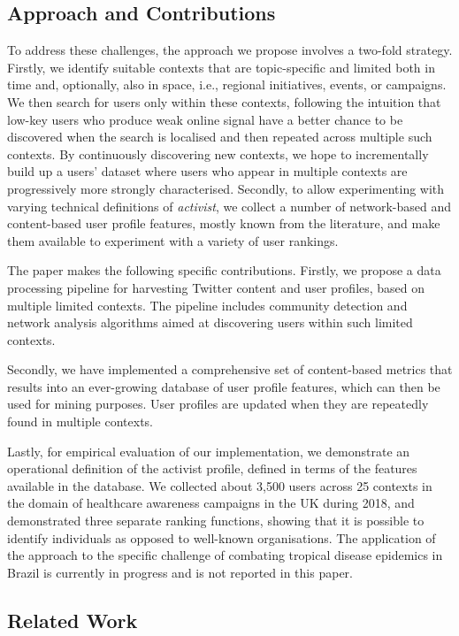\subsection{Approach and Contributions}

To address these challenges, the approach we propose involves a two-fold strategy. 
Firstly, we identify suitable contexts that are topic-specific and limited both in time and, optionally, also in space, i.e., regional initiatives, events, or campaigns.
We then search for users only within these contexts, following the intuition that low-key users who produce weak online signal have a better chance to be discovered when the search is localised and then repeated across multiple such contexts.
By continuously discovering new contexts, we hope to incrementally build up a users' dataset where users who appear in multiple contexts are progressively more strongly characterised.
%
Secondly, to allow experimenting with varying technical definitions of \textit{activist}, we collect a number of network-based and content-based user profile features, mostly known from the literature, and make them available to experiment with a variety of user rankings.

The paper makes the following specific contributions.
%
Firstly, we propose a data processing pipeline for harvesting Twitter content and user profiles, based on multiple limited contexts. 
The pipeline includes community detection and network analysis algorithms aimed at discovering users within such limited contexts.

Secondly, we have implemented a comprehensive set of content-based metrics that results into an ever-growing database of user profile features, which can then be used for mining purposes. 
User profiles are updated when they are repeatedly found in multiple contexts.

Lastly, for empirical evaluation of our implementation, we demonstrate an operational definition of the activist profile, defined in terms of the features available in the database. We collected about 3,500 users  across 25 contexts in the domain of healthcare awareness campaigns in the UK during 2018, and demonstrated three separate ranking functions, showing that it is possible to identify individuals as opposed to well-known organisations.
The application of the approach to the specific challenge of combating tropical disease epidemics in Brazil is currently in progress and is not reported in this paper.

\subsection{Related Work}  \label{sec:related}


